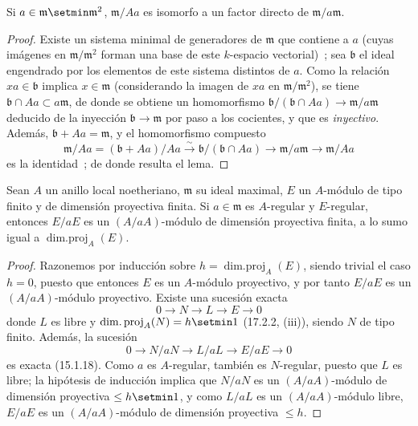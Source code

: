 \begin{lemma}[17.3.1.3]
\label{0.17.3.1.3-fr}
Si $a\in\mathfrak{m}\setmin\mathfrak{m}^2$, $\mathfrak{m}/Aa$ es isomorfo a un
factor directo de $\mathfrak{m}/a\mathfrak{m}$.
\end{lemma}

\begin{proof}
Existe un sistema minimal de generadores de $\mathfrak{m}$ que contiene a $a$
(cuyas imágenes en $\mathfrak{m}/\mathfrak{m}^2$ forman una base de este
$k$-espacio vectorial)~; sea $\mathfrak{b}$ el ideal engendrado por los elementos
de este sistema distintos de $a$. Como la relación $xa\in\mathfrak{b}$ implica
$x\in\mathfrak{m}$ (considerando la imagen de $xa$ en
$\mathfrak{m}/\mathfrak{m}^2$), se tiene
$\mathfrak{b}\cap Aa\subset a\mathfrak{m}$, de donde se obtiene un homomorfismo
$\mathfrak{b}/(\mathfrak{b}\cap Aa)\longrightarrow
\mathfrak{m}/a\mathfrak{m}$ deducido de la inyección
$\mathfrak{b}\longrightarrow\mathfrak{m}$ por paso a los cocientes, y que
es \emph{inyectivo}. Además, $\mathfrak{b}+Aa=\mathfrak{m}$, y
el homomorfismo compuesto
\[
  \mathfrak{m}/Aa=(\mathfrak{b}+Aa)/Aa
  \xrightarrow{\sim}\mathfrak{b}/(\mathfrak{b}\cap Aa)
  \longrightarrow\mathfrak{m}/a\mathfrak{m}
  \longrightarrow\mathfrak{m}/Aa
\]
es la identidad~; de donde resulta el lema.
\end{proof}

\begin{lemma}[17.3.1.4]
\label{0.17.3.1.4-fr}
Sean $A$ un anillo local noetheriano, $\mathfrak{m}$ su ideal maximal, $E$
un $A$-módulo de tipo finito y de dimensión proyectiva finita. Si
$a\in\mathfrak{m}$ es $A$-regular y $E$-regular, entonces $E/aE$ es un
$(A/aA)$-módulo de dimensión proyectiva finita, a lo sumo igual a
$\operatorname{dim.proj}_A(E)$.
\end{lemma}
\begin{proof}
Razonemos por inducción sobre $h=\operatorname{dim.proj}_A(E)$, siendo trivial
el caso $h=0$, puesto que entonces $E$ es un $A$-módulo proyectivo, y por tanto
$E/aE$ es un $(A/aA)$-módulo proyectivo. Existe una sucesión exacta
\[
  0\longrightarrow N\longrightarrow L\longrightarrow E\longrightarrow0
\]
donde $L$ es libre y $\operatorname{dim.proj}_A(N)=h\setmin 1$ (17.2.2, (iii)), siendo
$N$ de tipo finito. Además, la sucesión
\[
  0\longrightarrow N/aN\longrightarrow L/aL\longrightarrow E/aE
  \longrightarrow0
\]
es exacta (15.1.18). Como $a$ es $A$-regular, también es $N$-regular, puesto
que $L$ es libre; la hipótesis de inducción implica que $N/aN$ es un
$(A/aA)$-módulo de dimensión proyectiva $\leq h\setmin 1$, y como $L/aL$ es un
$(A/aA)$-módulo libre, $E/aE$ es un $(A/aA)$-módulo de dimensión proyectiva
$\leq h$.
\end{proof}

